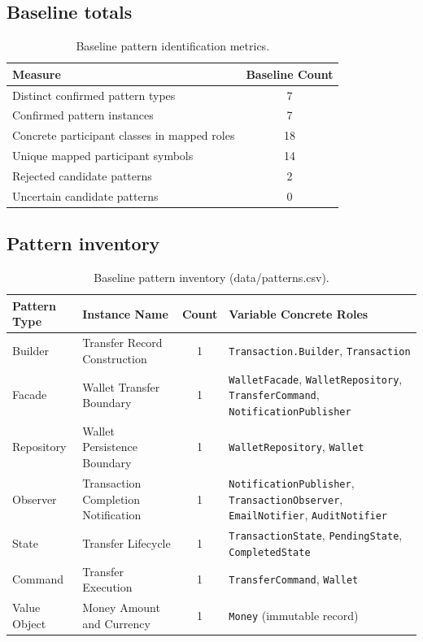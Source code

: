 \documentclass[11pt,a4paper]{article}
\begin{document}
\subsection{Baseline totals}
\begin{table}[h!]
\centering
\begin{tabular}{lc}
\toprule
\textbf{Measure} & \textbf{Baseline Count} \\
\midrule
Distinct confirmed pattern types & 7 \\
Confirmed pattern instances & 7 \\
Concrete participant classes in mapped roles & 18 \\
Unique mapped participant symbols & 14 \\
Rejected candidate patterns & 2 \\
Uncertain candidate patterns & 0 \\
\bottomrule
\end{tabular}
\caption{Baseline pattern identification metrics.}
\end{table}

\subsection{Pattern inventory}
\begin{table}[h!]
\centering
\small
\begin{tabularx}{\textwidth}{p{2.8cm}p{4cm}cp{5cm}}
\toprule
\textbf{Pattern Type} & \textbf{Instance Name} & \textbf{Count} & \textbf{Variable Concrete Roles} \\
\midrule
Builder & Transfer Record Construction & 1 & \texttt{Transaction.Builder}, \texttt{Transaction} \\
Facade & Wallet Transfer Boundary & 1 & \texttt{WalletFacade}, \texttt{WalletRepository}, \texttt{TransferCommand}, \texttt{NotificationPublisher} \\
Repository & Wallet Persistence Boundary & 1 & \texttt{WalletRepository}, \texttt{Wallet} \\
Observer & Transaction Completion Notification & 1 & \texttt{NotificationPublisher}, \texttt{TransactionObserver}, \texttt{EmailNotifier}, \texttt{AuditNotifier} \\
State & Transfer Lifecycle & 1 & \texttt{TransactionState}, \texttt{PendingState}, \texttt{CompletedState} \\
Command & Transfer Execution & 1 & \texttt{TransferCommand}, \texttt{Wallet} \\
Value Object & Money Amount and Currency & 1 & \texttt{Money} (immutable record) \\
\bottomrule
\end{tabularx}
\caption{Baseline pattern inventory (data/patterns.csv).}
\end{table}
\end{document}
